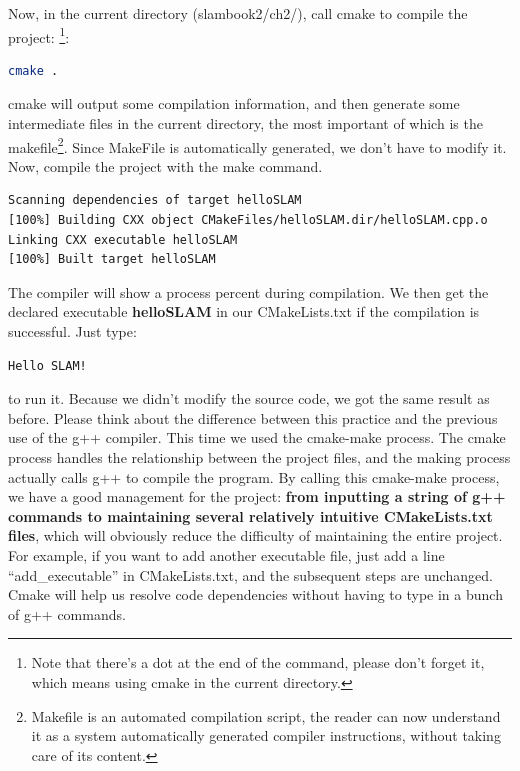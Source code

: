 Now, in the current directory (slambook2/ch2/), call cmake to compile the project: \footnote{Note that there's a dot at the end of the command, please don't forget it, which means using cmake in the current directory. }:
\begin{lstlisting}[language=sh,caption=Terminal input]
cmake .
\end{lstlisting}
cmake will output some compilation information, and then generate some intermediate files in the current directory, the most important of which is the makefile\footnote{Makefile is an automated compilation script, the reader can now understand it as a system automatically generated compiler instructions, without taking care of its content. }. Since MakeFile is automatically generated, we don't have to modify it. Now, compile the project with the make command.
\begin{lstlisting}[language=sh,caption=Terminal input]
% make
Scanning dependencies of target helloSLAM
[100%] Building CXX object CMakeFiles/helloSLAM.dir/helloSLAM.cpp.o
Linking CXX executable helloSLAM
[100%] Built target helloSLAM
\end{lstlisting}
The compiler will show a process percent during compilation. We then get the declared executable \textbf{helloSLAM} in our CMakeLists.txt if the compilation is successful. Just type:
\begin{lstlisting}[language=sh,caption=Terminal Input]
% ./helloSLAM
Hello SLAM!
\end{lstlisting}
to run it. Because we didn't modify the source code, we got the same result as before. Please think about the difference between this practice and the previous use of the g++ compiler. This time we used the cmake-make process. The cmake process handles the relationship between the project files, and the making process actually calls g++ to compile the program. By calling this cmake-make process, we have a good management for the project: \textbf{from inputting a string of g++ commands to maintaining several relatively intuitive CMakeLists.txt files}, which will obviously reduce the difficulty of maintaining the entire project. For example, if you want to add another executable file, just add a line ``add\_executable'' in CMakeLists.txt, and the subsequent steps are unchanged. Cmake will help us resolve code dependencies without having to type in a bunch of g++ commands.

